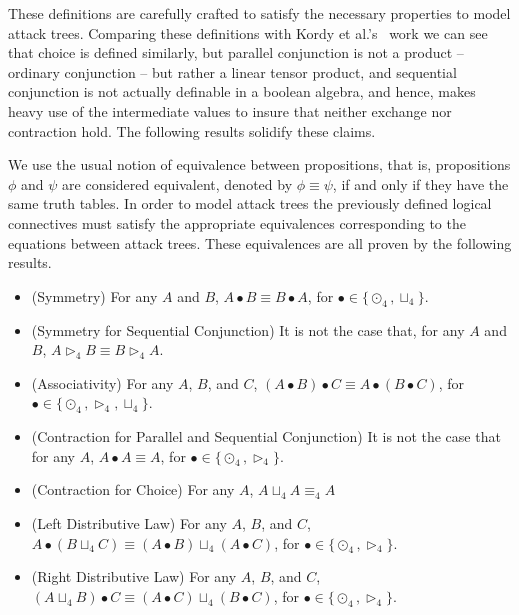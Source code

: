 These definitions are carefully crafted to satisfy the necessary
properties to model attack trees.  Comparing these definitions with
Kordy et al.'s~\cite{Kordy:2012} work we can see that choice is
defined similarly, but parallel conjunction is not a product --
ordinary conjunction -- but rather a linear tensor product, and
sequential conjunction is not actually definable in a boolean algebra,
and hence, makes heavy use of the intermediate values to insure that
neither exchange nor contraction hold.  The following results solidify
these claims.

We use the usual notion of equivalence between propositions, that is,
propositions $\phi$ and $\psi$ are considered equivalent, denoted by
$\phi \equiv \psi$, if and only if they have the same truth tables. In
order to model attack trees the previously defined logical connectives
must satisfy the appropriate equivalences corresponding to the
equations between attack trees.  These equivalences are all proven by
the following results.
\begin{lemma}
  \label{lemma:props_atree_ops_quaternary-semantics}
  \begin{itemize}
  \item[] (Symmetry) For any $A$ and $B$, $A \bullet B \equiv B \bullet A$, for $\bullet \in \{\odot_4, \sqcup_4\}$.\\[-5px]
  \item[] (Symmetry for Sequential Conjunction) It is not the case that, for any $A$ and $B$, $A \rhd_4 B \equiv B \rhd_4 A$.\\[-5px]
  \item[] (Associativity) For any $A$, $B$, and $C$, $(A \bullet B) \bullet C \equiv A \bullet (B \bullet C)$, for $\bullet \in \{\odot_4, \rhd_4, \sqcup_4\}$.\\[-5px]
  \item[] (Contraction for Parallel and Sequential Conjunction) It is not the case that for any $A$, $A \bullet A \equiv A$, for $\bullet \in \{\odot_4, \rhd_4\}$.\\[-5px]
  \item[] (Contraction for Choice) For any $A$, $A \sqcup_4 A \equiv_4 A$\\[-5px]
  \item[] (Left Distributive Law) For any $A$, $B$, and $C$, $A \bullet (B \sqcup_4 C) \equiv (A \bullet B) \sqcup_4 (A \bullet C)$, for $\bullet \in \{\odot_4, \rhd_4\}$.\\[-5px]
  \item[] (Right Distributive Law) For any $A$, $B$, and $C$, $(A \sqcup_4 B) \bullet C \equiv (A \bullet C) \sqcup_4 (B \bullet C)$, for $\bullet \in \{\odot_4, \rhd_4\}$.\\
  \end{itemize}
\end{lemma}
